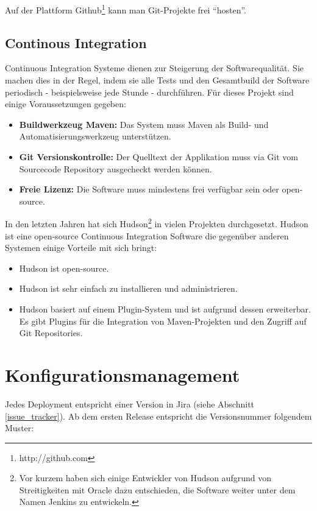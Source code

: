 Auf der Plattform Github\footnote{http://github.com} kann man Git-Projekte frei ``hosten''.




\subsection{Continous Integration}
Continuous Integration Systeme dienen zur Steigerung der Softwarequalität. Sie machen dies in der Regel, indem sie alle Tests und den Gesamtbuild der Software periodisch - beispielsweise jede Stunde - durchführen. Für dieses Projekt sind einige Voraussetzungen gegeben:
\begin{itemize}
	\item \textbf{Buildwerkzeug Maven:} Das System muss Maven als Build- und Automatisierungswerkzeug unterstützen.
	\item \textbf{Git Versionskontrolle:} Der Quelltext der Applikation muss via Git vom Sourcecode Repository ausgecheckt werden können.
	\item \textbf{Freie Lizenz:} Die Software muss mindestens frei verfügbar sein oder open-source.
\end{itemize}
In den letzten Jahren hat sich Hudson\footnote{Vor kurzem haben sich einige Entwickler von Hudson aufgrund von Streitigkeiten mit Oracle dazu entschieden, die Software weiter unter dem Namen Jenkins zu entwickeln.} in vielen Projekten durchgesetzt. Hudson ist eine open-source Continuous Integration Software die gegenüber anderen Systemen einige Vorteile mit sich bringt:
\begin{itemize}
\item Hudson ist open-source.
\item Hudson ist sehr einfach zu installieren und administrieren.
\item Hudson basiert auf einem Plugin-System und ist aufgrund dessen erweiterbar. Es gibt Plugins für die Integration von Maven-Projekten und den Zugriff auf Git Repositories.
\end{itemize}

\section{Konfigurationsmanagement}
Jedes Deployment entspricht einer Version in Jira (siehe Abschnitt \ref{issue_tracker}).
Ab dem ersten Release entspricht die Versionsnummer folgendem Muster:
\begin{center}
\end{center}

